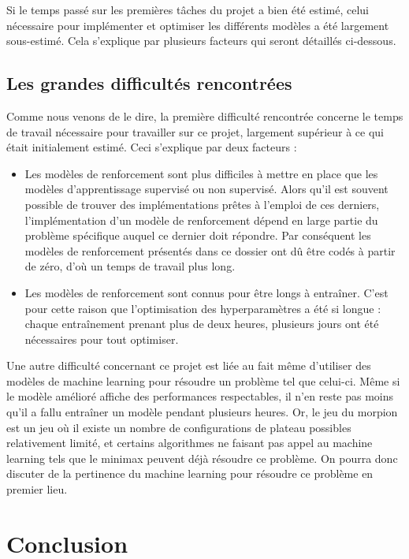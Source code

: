 \documentclass[french]{article}
\begin{document}
    Si le temps passé sur les premières tâches du projet a bien été estimé, celui nécessaire pour implémenter et optimiser les différents modèles a été largement sous-estimé. Cela s'explique par plusieurs facteurs qui seront détaillés ci-dessous.

    \subsection{Les grandes difficultés rencontrées}

    Comme nous venons de le dire, la première difficulté rencontrée concerne le temps de travail nécessaire pour travailler sur ce projet, largement supérieur à ce qui était initialement estimé. Ceci s'explique par deux facteurs :
    \begin{itemize}
        \item Les modèles de renforcement sont plus difficiles à mettre en place que les modèles d'apprentissage supervisé ou non supervisé. Alors qu'il est souvent possible de trouver des implémentations prêtes à l'emploi de ces derniers, l'implémentation d'un modèle de renforcement dépend en large partie du problème spécifique auquel ce dernier doit répondre. Par conséquent les modèles de renforcement présentés dans ce dossier ont dû être codés à partir de zéro, d'où un temps de travail plus long.
        \item Les modèles de renforcement sont connus pour être longs à entraîner. C'est pour cette raison que l'optimisation des hyperparamètres a été si longue : chaque entraînement prenant plus de deux heures, plusieurs jours ont été nécessaires pour tout optimiser.
    \end{itemize}

    Une autre difficulté concernant ce projet est liée au fait même d'utiliser des modèles de machine learning pour résoudre un problème tel que celui-ci. Même si le modèle amélioré affiche des performances respectables, il n'en reste pas moins qu'il a fallu entraîner un modèle pendant plusieurs heures. Or, le jeu du morpion est un jeu où il existe un nombre de configurations de plateau possibles relativement limité, et certains algorithmes ne faisant pas appel au machine learning tels que le minimax peuvent déjà résoudre ce problème. On pourra donc discuter de la pertinence du machine learning pour résoudre ce problème en premier lieu.

    \section{Conclusion}
\end{document}
